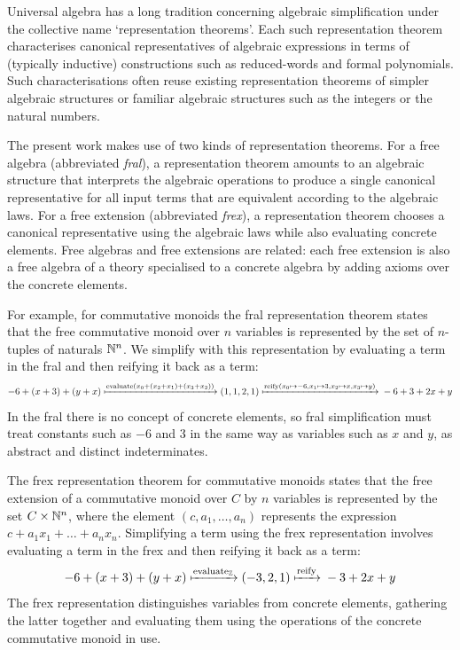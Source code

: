 Universal algebra has a long tradition concerning algebraic
simplification under the collective name `representation
theorems'. Each such representation theorem characterises canonical
representatives of algebraic expressions in terms of (typically inductive)
constructions such as reduced-words and formal polynomials. Such
characterisations often
reuse existing representation theorems of simpler algebraic
structures or familiar algebraic structures such as the integers or
the natural numbers.

The present work makes use of two kinds of representation theorems.
%
For a free algebra (abbreviated \emph{fral}), a representation theorem
amounts to an algebraic structure that interprets the algebraic
operations to produce a single canonical representative for all input
terms that are equivalent according to the algebraic laws.
%
For a free extension (abbreviated \emph{frex}), a representation
theorem chooses a canonical representative using the algebraic laws
while also evaluating concrete elements.
%
Free algebras and free extensions are related: each free extension is
also a free algebra of a theory specialised to a concrete algebra by
adding axioms over the concrete elements.

For example, for commutative monoids the fral representation theorem
states that the free commutative monoid over $n$ variables is
represented by the set of $n$-tuples of naturals $\mathbb{N}^n$.
We simplify with this representation by evaluating
a term in the fral and then reifying it back as a term:
\[
-6 + (x+3) + (y+x)
{}\xmapsto{\text{evaluate}(x_0 + (x_2 + x_1) + (x_3 + x_2))}{}
(1, 1, 2, 1)
{}\xmapsto{\text{reify}(x_0 \mapsto -6, x_1 \mapsto 3, x_2 \mapsto x, x_3 \mapsto y)}{}
-6 +3 + 2x + y
\]\label{new-intro fral example}
%
In the fral there is no concept of concrete elements, so fral
simplification must treat constants such as $-6$ and $3$ in the same
way as variables such as $x$ and $y$, as abstract and distinct
indeterminates.

The frex representation theorem for commutative monoids
states that the free extension of a commutative monoid over $C$ by $n$
variables is represented by the set $C \times \mathbb{N}^n$, where
the element $(c, a_1,
\ldots, a_n)$ represents the expression $c + a_1x_1 + \ldots +
a_nx_n$.
%
Simplifying a term using the frex representation involves evaluating a
term in the frex and then reifying it back as a term:
\[
-6 + (x+3) + (y+x)
{}\xmapsto{\text{evaluate}_{\mathbb{Z}}}{}
(-3, 2, 1)
{}\xmapsto{\text{reify}}{}
-3 + 2x + y
\]
The frex representation distinguishes variables from concrete
elements, gathering the latter together and evaluating them using the
operations of the concrete commutative monoid in use.

